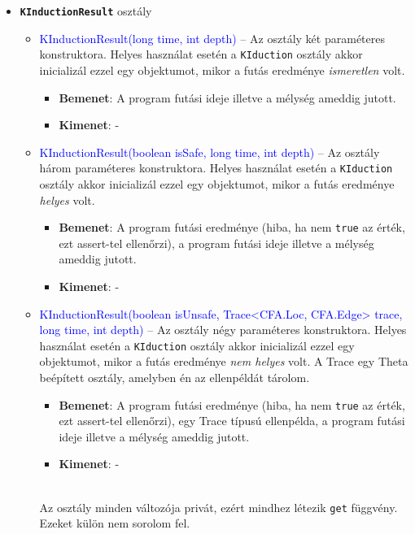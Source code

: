 \begin{itemize}
	\item \textbf{\texttt{KInductionResult}} osztály
	\begin{itemize}
		\item \textcolor{blue}{KInductionResult(long time, int depth)} -- Az osztály két paraméteres konstruktora. Helyes használat esetén a \texttt{KIduction} osztály akkor inicializál ezzel egy objektumot, mikor a futás eredménye \textit{ismeretlen} volt.
		\begin{itemize}
			\item \textbf{Bemenet}: A program futási ideje illetve a mélység ameddig jutott.
			\item \textbf{Kimenet}: -
		\end{itemize}
	
		\item \textcolor{blue}{KInductionResult(boolean isSafe, long time, int depth)} -- Az osztály három paraméteres konstruktora. Helyes használat esetén a \texttt{KIduction} osztály akkor inicializál ezzel egy objektumot, mikor a futás eredménye \textit{helyes} volt.
		\begin{itemize}
			\item \textbf{Bemenet}: A program futási eredménye (hiba, ha nem \texttt{true} az érték, ezt assert-tel ellenőrzi), a program futási ideje illetve a mélység ameddig jutott.
			\item \textbf{Kimenet}: -
		\end{itemize}
	
		\item \textcolor{blue}{KInductionResult(boolean isUnsafe, Trace<CFA.Loc, CFA.Edge> trace, long time, int depth)} -- Az osztály négy paraméteres konstruktora. Helyes használat esetén a \texttt{KIduction} osztály akkor inicializál ezzel egy objektumot, mikor a futás eredménye \textit{nem helyes} volt. A Trace egy Theta beépített osztály, amelyben én az ellenpéldát tárolom.
		\begin{itemize}
			\item \textbf{Bemenet}: A program futási eredménye (hiba, ha nem \texttt{true} az érték, ezt assert-tel ellenőrzi), egy Trace típusú ellenpélda, a program futási ideje illetve a mélység ameddig jutott.
			\item \textbf{Kimenet}: -
		\end{itemize}
		\ \\
		Az osztály minden változója privát, ezért mindhez létezik \texttt{get} függvény. Ezeket külön nem sorolom fel.
	\end{itemize}


\end{itemize}

